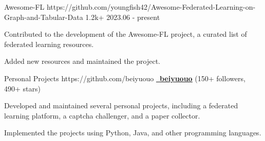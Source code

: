 \begin{cventries}

\cvproject
{Awesome-FL} %
{https://github.com/youngfish42/Awesome-Federated-Learning-on-Graph-and-Tabular-Data}
{1.2k+} %
{2023.06 - present} %
{
\begin{cvitems} %
\item {Contributed to the development of the Awesome-FL project, a curated list of federated learning resources.}
\item {Added new resources and maintained the project.}
\end{cvitems}
} %



\cvproject
{Personal Projects} %
{https://github.com/beiyuouo} %
{} %
{\href{https://github.com/beiyuouo}{\textcolor{text}{\faGithub~\textbf{\underline{beiyuouo}}}} (150+ followers, 490+ stars)} %
{
\begin{cvitems} %
\item {Developed and maintained several personal projects, including a federated learning platform, a captcha challenger, and a paper collector.}
\item {Implemented the projects using Python, Java, and other programming languages.}
\end{cvitems}
} %


\end{cventries}
